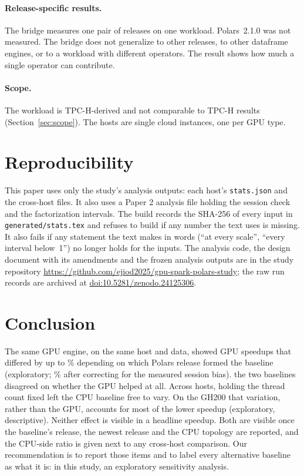 \documentclass[11pt]{article}
\begin{document}
\paragraph{Release-specific results.} The bridge measures one pair of releases
on one workload. Polars~2.1.0 was not measured. The bridge does not generalize
to other releases, to other dataframe engines, or to a workload with different
operators. The  result shows how much a single operator can
contribute.

\paragraph{Scope.} The workload is TPC-H-derived and not comparable to TPC-H
results (Section~\ref{sec:scope}). The hosts are single cloud instances, one
per GPU type.

\section{Reproducibility}
\label{sec:repro}

This paper uses only the study's analysis outputs: each host's
\texttt{stats.json} and the cross-host files.
\ifpcheck
It also uses a Paper 2 analysis file holding the session check and the
factorization intervals.
\fi
The build records the SHA-256 of every input in \texttt{generated/stats.tex}
and refuses to build if any number the text uses is missing. It also fails if
any statement the text makes in words (``at every scale'', ``every interval
below~1'') no longer holds for the inputs. The analysis code, the design
document with its amendments and the frozen analysis outputs are in the study
repository \url{https://github.com/ejiod2025/gpu-spark-polars-study}; the raw
run records are archived at \href{https://doi.org/10.5281/zenodo.24125306}{doi:10.5281/zenodo.24125306}.

\section{Conclusion}
\label{sec:conclusion}

The same GPU engine, on the same host and data, showed GPU speedups that
differed by up to \% depending on which Polars release formed
the baseline (exploratory; \% after correcting for the
measured session bias).  the two baselines disagreed on whether the GPU
helped at all. Across hosts, holding the thread count fixed left the CPU
baseline free to vary. On the GH200 that variation, rather than the GPU,
accounts for most of the lower speedup (exploratory, descriptive). Neither effect is visible in a headline speedup.
Both are visible once the baseline's release, the newest release and the CPU
topology are reported, and the CPU-side ratio is given next to any cross-host
comparison. Our recommendation is to report those items and to label every
alternative baseline as what it is: in this study, an exploratory sensitivity
analysis.
\end{document}
